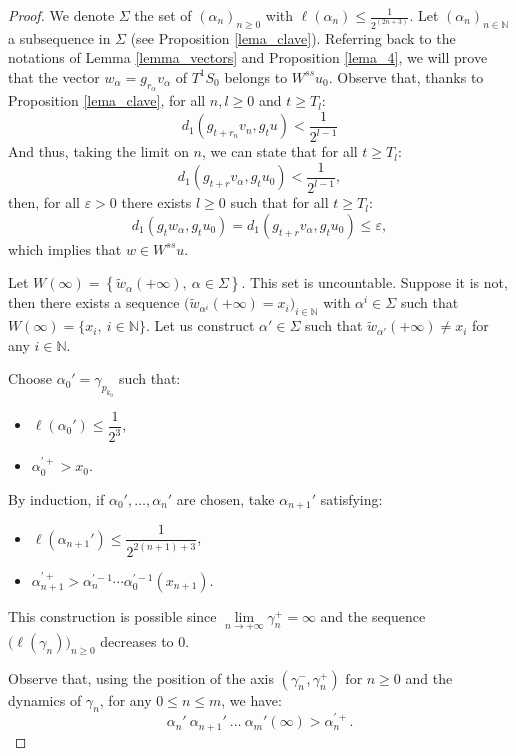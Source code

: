 \documentclass[a4paper,english,reqno]{amsart}
\newcommand{\N}{\mathbb{N}} %
\theoremstyle{definition}
\numberwithin{equation}{section}
\begin{document}
\begin{proof}
		We denote $\Sigma$ the set of $(\alpha_n)_{n\geq 0}$ with $\ell(\alpha_n)\leq \frac{1}{2^{(2n+3)}}$.
		Let $(\alpha_n)_{n\in\N}$ a subsequence in $\Sigma$ (see Proposition \ref{lema_clave}). Referring back to the notations of Lemma \ref{lemma_vectors} and Proposition \ref{lema_4}, we will prove that the vector $w_\alpha=g_{r_\alpha} v_\alpha$ of $T^1S_0$ belongs to $W^{ss}u_0.$ 
		Observe that, thanks to Proposition \ref{lema_clave}, for all $n,l\geq 0$ and $t\geq T_l:$
		$$ d_1(g_{t+r_n}v_n,g_t u)<\frac{1}{2^{l-1}}$$ And thus, taking the limit on $n$, we can state that for all $t\geq T_l$:
		$$ d_1(g_{t+r}v_\alpha,g_t u_0)<\frac{1}{2^{l-1}}, $$
		then, for all $\varepsilon >0 $ there exists $l\geq 0$ such that for all $t\geq T_l$:
		$$ d_1(g_tw_\alpha,g_tu_0)=d_1(g_{t+r}v_\alpha,g_tu_0)\leq\varepsilon,$$
		which implies that $w\in W^{ss}u$.

Let
$
W(\infty)=\left\{\tilde w_{\alpha}(+\infty),\ \alpha\in\Sigma\right\}.
$
This set is uncountable. Suppose it is not, then there exists a sequence
$
\bigl(\tilde w_{\alpha^i}(+\infty)=x_i\bigr)_{i\in\mathbb N}
$
with $\alpha^i\in\Sigma$ such that
$
W(\infty)=\{x_i,\ i\in\mathbb N\}.
$
Let us construct $\alpha'\in\Sigma$ such that
$
\tilde w_{\alpha'}(+\infty)\neq x_i
$
for any $i\in\mathbb N$.

Choose
$
\alpha_0'=\gamma_{p_{k_0}}
$
such that:
\begin{itemize}
	\item $\ell(\alpha_0')\leq \dfrac{1}{2^3}$,
	\item $
	\alpha_0^{\prime +}>x_0.
$
\end{itemize}

By induction, if $\alpha_0',\ldots,\alpha_n'$ are chosen, take
$
\alpha_{n+1}'
$
satisfying:
\begin{itemize}
	\item $\ell(\alpha_{n+1}')\leq \dfrac{1}{2^{2(n+1)+3}}$,
	\item $
	\alpha_{n+1}^{\prime +}>
	\alpha_n^{\prime -1}\cdots \alpha_0^{\prime -1}(x_{n+1}).
	$
\end{itemize}

This construction is possible since
$
\lim\limits_{n\to+\infty}\gamma_n^+=\infty
$
and the sequence
$
\bigl(\ell(\gamma_n)\bigr)_{n\geq 0}
$
decreases to $0$.

Observe that, using the position of the axis
$
(\gamma_n^-,\gamma_n^+) \text{ for } n\geq 0
$
and the dynamics of $\gamma_n$, for any $0\leq n\leq m$, we have:
\[
\alpha_n'\ \alpha_{n+1}'\ \ldots\ \alpha_m'(\infty)>\alpha_n^{\prime +}.
\]


\end{proof}
\end{document}
